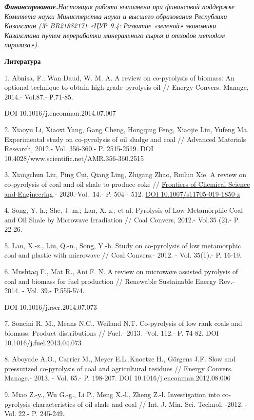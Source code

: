 \emph{{\bfseries Финансирование.}Настоящая работа выполнена при финансовой
поддержке Комитета науки Министерства науки и высшего образования
Республики Казахстан (№ BR21882171 «ЦУР 9.4: Развитие «зеленой»
экономики Казахстана путем переработки минерального сырья и отходов
методом пиролиза»).}

{\bfseries Литература}

1. Abnisa, F.; Wan Daud, W. M. A. A review on co-pyrolysis of biomass:
An optional technique to obtain high-grade pyrolysis oil // Energy
Convers. Manage, 2014.- Vol.87.- Р.71-85.

DOI 10.1016/j.enconman.2014.07.007

2. Xiaoyu Li, Xiaoxi Yang, Gang Cheng, Hongqing Feng, Xiaojie Liu,
Yufeng Ma. Experimental study on co-pyrolysis of oil sludge and coal //
Advanced Materials Research, 2012.- Vol. 356-360.- P. 2515-2519. DOI
10.4028/www.scientific.net/AMR.356-360.2515

3. Xiangchun Liu, Ping Cui, Qiang Ling, Zhigang Zhao, Ruilun Xie. A
review on co-pyrolysis of coal and oil shale to produce coke //
\href{https://link.springer.com/journal/11705}{Frontiers of Chemical
Science and Engineering}.- 2020.-Vol.~14.- P. 504 - 512.
\href{https://doi.org/10.1007/s11705-019-1850-z}{DOI
10.1007/s11705-019-1850-z}

4. Song, Y.-h.; She, J.-m.; Lan, X.-z.; et al. Pyrolysis of Low
Metamorphic Coal and Oil Shale by Microwave Irradiation // Coal Convers,
2012.- Vol.35 (2).- P. 22-26.

5. Lan, X.-z., Liu, Q.-n., Song, Y.-h. Study on co-pyrolysis of low
metamorphic coal and plastic with microwave // Coal Convers.- 2012. -
Vol. 35(1).- P. 16-19.

6. Mushtaq F., Mat R., Ani F. N. A review on microwave assisted
pyrolysis of coal and biomass for fuel production // Renewable
Sustainable Energy Rev.- 2014. - Vol. 39.- P.555-574.

DOI 10.1016/j.rser.2014.07.073

7. Soncini R. M., Means N.C., Weiland N.T. Co-pyrolysis of low rank
coals and biomass: Product distributions // Fuel.- 2013. -Vol. 112.- P.
74-82. DOI 10.1016/j.fuel.2013.04.073

8. Aboyade A.O., Carrier M., Meyer E.L.,Knoetze H., Görgens J.F. Slow
and pressurized co-pyrolysis of coal and agricultural residues // Energy
Convers. Manage.- 2013. - Vol. 65.- P. 198-207. DOI
10.1016/j.enconman.2012.08.006

9. Miao Z.-y., Wu G.-g., Li P., Meng X.-l., Zheng Z.-l. Investigation
into co-pyrolysis characteristics of oil shale and coal // Int. J. Min.
Sci. Technol. -2012. - Vol. 22.- P. 245-249.

